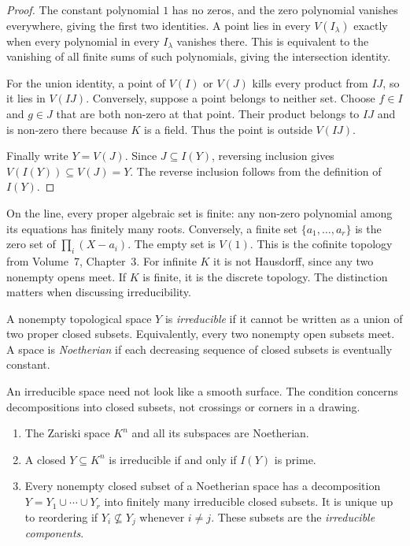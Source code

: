 \begin{proof}
The constant polynomial $1$ has no zeros, and the zero polynomial vanishes everywhere, giving the first two identities. A point lies in every $V(I_\lambda)$ exactly when every polynomial in every $I_\lambda$ vanishes there. This is equivalent to the vanishing of all finite sums of such polynomials, giving the intersection identity.

For the union identity, a point of $V(I)$ or $V(J)$ kills every product from $IJ$, so it lies in $V(IJ)$. Conversely, suppose a point belongs to neither set. Choose $f\in I$ and $g\in J$ that are both non-zero at that point. Their product belongs to $IJ$ and is non-zero there because $K$ is a field. Thus the point is outside $V(IJ)$.

Finally write $Y=V(J)$. Since $J\subseteq I(Y)$, reversing inclusion gives $V(I(Y))\subseteq V(J)=Y$. The reverse inclusion follows from the definition of $I(Y)$.
\end{proof}

On the line, every proper algebraic set is finite: any non-zero polynomial among its equations has finitely many roots. Conversely, a finite set $\{a_1,\ldots,a_r\}$ is the zero set of $\prod_i(X-a_i)$. The empty set is $V(1)$. This is the cofinite topology from Volume~7, Chapter~3. For infinite $K$ it is not Hausdorff, since any two nonempty opens meet. If $K$ is finite, it is the discrete topology. The distinction matters when discussing irreducibility.

\begin{definition}\label{def:irreducible}
A nonempty topological space $Y$ is \emph{irreducible} if it cannot be written as a union of two proper closed subsets. Equivalently, every two nonempty open subsets meet. A space is \emph{Noetherian} if each decreasing sequence of closed subsets is eventually constant.
\end{definition}

An irreducible space need not look like a smooth surface. The condition concerns decompositions into closed subsets, not crossings or corners in a drawing.

\begin{proposition}\label{prop:components}
\leavevmode
\begin{enumerate}[label=(\alph*)]
\item The Zariski space $K^n$ and all its subspaces are Noetherian.
\item A closed $Y\subseteq K^n$ is irreducible if and only if $I(Y)$ is prime.
\item Every nonempty closed subset of a Noetherian space has a decomposition $Y=Y_1\cup\cdots\cup Y_r$ into finitely many irreducible closed subsets. It is unique up to reordering if $Y_i\not\subseteq Y_j$ whenever $i\ne j$. These subsets are the \emph{irreducible components}.
\end{enumerate}
\end{proposition}

